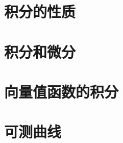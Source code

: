 \documentclass{article}
\begin{document}
\section{积分的性质}
\section{积分和微分}
\section{向量值函数的积分}
\section{可测曲线}
\end{document}
